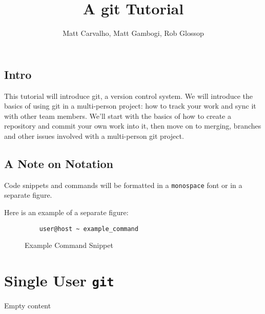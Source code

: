 \documentclass[11pt]{report}
\title{A git Tutorial}
\author{Matt Carvalho, Matt Gambogi, Rob Glossop}
\begin{document}
\thispagestyle{empty}
\maketitle

\clearpage {} 

\tableofcontents

\listoffigures

\clearpage {}
\section{Intro}
This tutorial will introduce git, a version control system. We will
introduce the basics of using git in a multi-person project: how to
track your work and sync it with other team members. We'll start with
the basics of how to create a repository and commit your own work into
it, then move on to merging, branches and other issues involved with a
multi-person git project.

\section{A Note on Notation}
Code snippets and commands will be formatted in a \texttt{monospace} font or in
a separate figure.

Here is an example of a separate figure:
\begin{figure}[h]
    \caption{Example Command Snippet}
    \begin{lstlisting}
    user@host ~ example_command
    \end{lstlisting}
\end{figure}

\chapter{Single User \texttt{git}}
 Empty content

\end{document}
